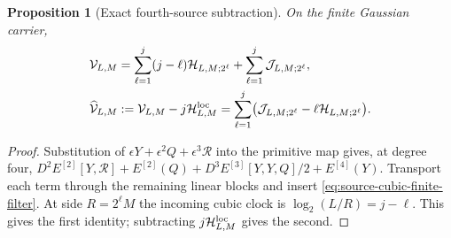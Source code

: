 \documentclass[11pt,oneside,openany]{book}
\newtheorem{proposition}[proposition]{Proposition}
\theoremstyle{definition}
\theoremstyle{remark}
\begin{document}
\begin{proposition}[Exact fourth-source subtraction]
\label{prop:fourth-source-subtraction}
On the finite Gaussian carrier,
\begin{align}
 \mathcal V_{L,M}
   &=\sum_{\ell=1}^{j}(j-\ell)\mathcal H_{L,M;2^\ell}
      +\sum_{\ell=1}^{j}\mathcal J_{L,M;2^\ell},\notag\\
 \widehat{\mathcal V}_{L,M}
   &:=\mathcal V_{L,M}-j\mathcal H^{\rm loc}_{L,M}
     =\sum_{\ell=1}^{j}
        \bigl(\mathcal J_{L,M;2^\ell}
                         -\ell\mathcal H_{L,M;2^\ell}\bigr).
 \label{eq:fourth-source-subtraction}
\end{align}
\end{proposition}
\begin{proof}
Substitution of $\epsilon Y+\epsilon^2Q+\epsilon^3\mathcal R$
into the primitive map gives, at degree four,
$D^2E^{[2]}[Y,\mathcal R]+E^{[2]}(Q)
 +D^3E^{[3]}[Y,Y,Q]/2+E^{[4]}(Y)$.
Transport each term through the remaining linear blocks and insert
\cref{eq:source-cubic-finite-filter}. At side $R=2^\ell M$ the incoming
cubic clock is $\log_2(L/R)=j-\ell$. This gives the first identity;
subtracting $j\mathcal H^{\rm loc}_{L,M}$ gives the second.
\end{proof}
\end{document}
